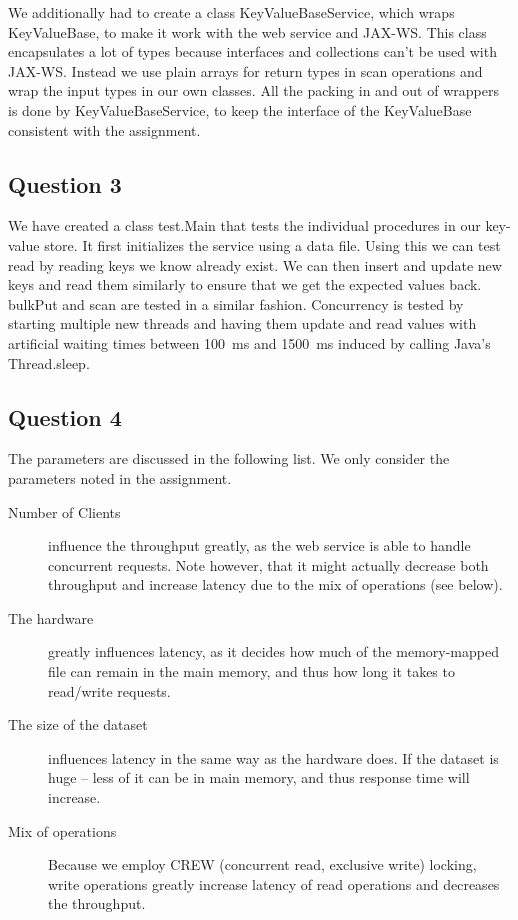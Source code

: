 \documentclass[a4paper,final]{article}
\newcommand{\mono}[1]{{\ttfamily#1}}
\begin{document}
We additionally had to create a class \mono{KeyValueBaseService}, which wraps
\mono{KeyValueBase}, to make it work with the web service and JAX-WS. This
class encapsulates a lot of types because interfaces and collections can't be
used with JAX-WS. Instead we use plain arrays for return types in scan
operations and wrap the input types in our own classes. All the packing in
and out of wrappers is done by \mono{KeyValueBaseService}, to keep the
interface of the \mono{KeyValueBase} consistent with the assignment.

\subsection*{Question 3}

We have created a class \mono{test.Main} that tests the individual procedures
in our key-value store. It first initializes the service using a data file.
Using this we can test \mono{read} by reading keys we know already exist. We
can then \mono{insert} and \mono{update} new keys and read them similarly to
ensure that we get the expected values back. \mono{bulkPut} and \mono{scan} are
tested in a similar fashion. Concurrency is tested by starting multiple new
threads and having them \mono{update} and \mono{read} values with artificial
waiting times between 100~ms and 1500~ms induced by calling Java's
\mono{Thread.sleep}.

\subsection*{Question 4}
The parameters are discussed in the following list. We only consider the
parameters noted in the assignment.

\begin{description}
    \item [Number of Clients] influence the throughput greatly, as the web
        service is able to handle concurrent requests. Note however, that it
        might actually decrease both throughput and increase latency due to
        the mix of operations (see below).
    \item [The hardware] greatly influences latency, as it decides how much of
        the memory-mapped file can remain in the main memory, and thus how
        long it takes to read/write requests.
    \item [The size of the dataset] influences latency in the same way as the
        hardware does. If the dataset is huge -- less of it can be in main
        memory, and thus response time will increase.
    \item [Mix of operations] Because we employ CREW (concurrent read,
        exclusive write) locking, write operations greatly increase latency
        of read operations and decreases the throughput.
\end{description}
\end{document}
